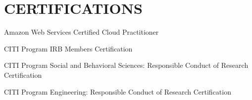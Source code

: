 \documentclass{article}
\newcommand{\listitemspace}{0.25em}
\renewenvironment{itemize}
{\begin{list}{}{\setlength{\leftmargin}{0em}
                \setlength{\parskip}{0em}
                \setlength{\itemsep}{\listitemspace}
                \setlength{\parsep}{\listitemspace}}}
{\end{list}}
\begin{document}
\section*{\normalsize{\MakeUppercase{Certifications}}}
\begin{itemize}
    \item Amazon Web Services Certified Cloud Practitioner
    \item CITI Program IRB Members Certification
    \item CITI Program Social and Behavioral Sciences: Responsible Conduct of Research Certification
    \item CITI Program Engineering: Responsible Conduct of Research Certification
\end{itemize}
\end{document}
